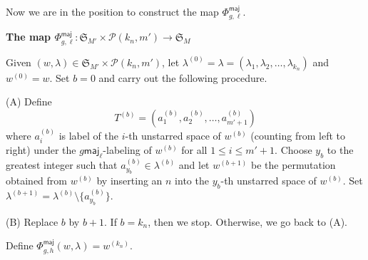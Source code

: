 \documentclass[12pt]{article}
\numberwithin{equation}{section}
\theoremstyle{plain}
\def\maj{\mathsf{maj}}
\begin{document}
   
   Now we are in the position to construct the map $\Phi^{\maj}_{g, \ell}$. 
   
    \begin{framed}
   	\begin{center}
   		{\bf The map $\Phi^{\maj}_{g,\ell}:\mathfrak{S}_{M'}\times \mathcal{P}(k_n, m') \longrightarrow \mathfrak{S}_{M}$ }
   	\end{center}
   Given  $(w, \lambda)\in \mathfrak{S}_{M'}\times \mathcal{P}(k_n, m') $, let $\lambda^{(0)}=\lambda=(\lambda_1, \lambda_2, \ldots, \lambda_{k_n})$ and  $w^{(0)}=w$. Set $b=0$ and carry out the following procedure. 
   	
   	(A) Define 
   	$$T^{(b)}=(a^{(b)}_{1}, a^{(b)}_2, \ldots,  a^{(b)}_{m'+1})$$ where $a^{(b)}_{i}$  is label of the $i$-th  unstarred space of  $w^{(b)}$ (counting from left to right) under the $g\maj_\ell$-labeling of $w^{(b)}$ for all $1\leq i\leq m'+1$. 
   	Choose $y_b$ to the greatest  integer such that $a^{(b)}_{y_b}\in \lambda^{(b)}$ and let  
 $w^{(b+1)} $  be the permutation obtained from $w^{(b)}$ by inserting an $n$ into the $y_{b}$-th unstarred space of $w^{(b)}$. Set $\lambda^{(b+1)}=\lambda^{(b)}\setminus \{ a^{(b)}_{y_b}\}$. 
 
 
   	(B)  Replace $b$ by $b+1$. If $b=k_n$, then we stop. Otherwise, we go back to (A). 
   	
   	Define $\Phi^{\maj}_{g,h}(w, \lambda)=w^{(k_n)}$. 
   	
   	
   \end{framed}
\end{document}
